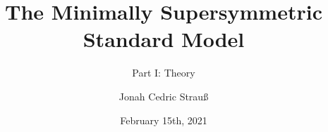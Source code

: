 
\title{The Minimally Supersymmetric Standard Model}
\subtitle{Part I: Theory}
\author{Jonah Cedric Strau\ss}
\date{February 15th, 2021}

\usepackage{xcolor}


\usepackage{fancyhdr}
\fancyhfoffset{0pt}

\usepackage[a4paper,
			width = 150mm,
			top = 30mm,
		    bottom=30mm,
		    ]{geometry}
\usepackage[onehalfspacing]{setspace}


\makeatletter
\pagestyle{fancy}
\fancyhf{}
\fancyhead[L]{\footnotesize\nouppercase\leftmark}
\fancyhead[R]{\footnotesize\nouppercase\@title}
\fancyfoot[C]{\thepage}
\renewcommand{\headrulewidth}{0.2pt}
\renewcommand{\footrulewidth}{0pt}
\makeatother



\usepackage{amsmath, amssymb, commath, mathtools}
\usepackage{physics}
\usepackage{slashed}
\usepackage{xfrac}
\usepackage[separate-uncertainty]{siunitx}
\usepackage{relsize} %
\usepackage{bbm}
\usepackage{chngcntr}
\usepackage[amsmath,thmmarks,hyperref]{ntheorem}
\usepackage{ wasysym }

\theoremstyle{nonumberbreak}
\theoremseparator{} 
\theoremsymbol{\ensuremath{\square}}
\newtheorem{proof}{\textit{Proof.}}

\usepackage{array} %
\usepackage{booktabs} %

\usepackage{fontspec, xunicode}
\usepackage[utf8]{inputenc}
\usepackage{lmodern}
\setmainfont{Palatino}
\setsansfont{Optima}
\setmonofont[Scale=MatchLowercase]{Menlo}
\usepackage{polyglossia}
\setmainlanguage{english}
\usepackage{microtype}
\usepackage{scrextend} %
\usepackage{csquotes}
\usepackage{graphicx} %
\usepackage{float} %
\usepackage{blindtext} %
\usepackage[labelfont=bf]{caption} %
\usepackage{subcaption} %
\usepackage{tikz}
\usetikzlibrary{patterns, decorations.markings}
\usepackage{tcolorbox}

